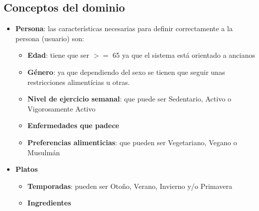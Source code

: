 \documentclass[11]{article}
\begin{document}
\subsection{Conceptos del dominio}
\begin{itemize}
\item \textbf{Persona}: las características necesarias para definir correctamente a la persona (usuario) son: \begin{itemize}
	\item \textbf{Edad}: tiene que ser $>=$ 65 ya que el sistema está orientado a ancianos
	\item \textbf{Género}: ya que dependiendo del sexo se tienen que seguir unas restricciones alimentícias u otras.
	\item \textbf{Nivel de ejercicio semanal}: que puede ser Sedentario, Activo o Vigorosamente Activo
	\item \textbf{Enfermedades que padece}
	\item \textbf{Preferencias alimenticias}: que pueden ser Vegetariano, Vegano o Musulmán
	\end{itemize}
	
	\item \textbf{Platos}
	\begin{itemize}
		\item \textbf{Temporadas}: pueden ser Otoño, Verano, Invierno y/o Primavera
		\item \textbf{Ingredientes}		
	\end{itemize}


\end{itemize}
\end{document}
